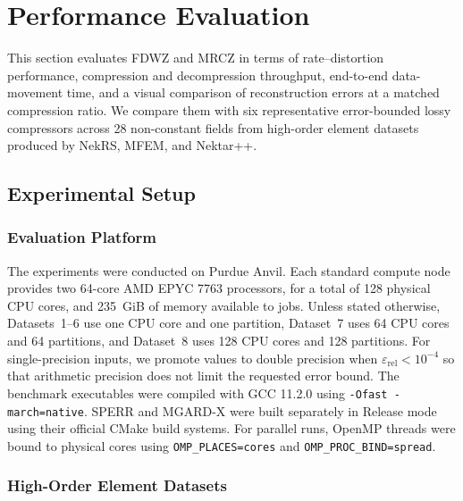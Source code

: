 \section{Performance Evaluation}\label{sec:performance evaluation}

This section evaluates FDWZ and MRCZ in terms of rate--distortion performance, compression and decompression throughput, end-to-end data-movement time, and a visual comparison of reconstruction errors at a matched compression ratio. We compare them with six representative error-bounded lossy compressors across 28 non-constant fields from high-order element datasets produced by NekRS, MFEM, and Nektar++.

\subsection{Experimental Setup}\label{sec:performance evaluation:setup}

\subsubsection{Evaluation Platform}\label{sec:evaluation-platform}\mbox{}

The experiments were conducted on Purdue Anvil. Each standard compute node provides two 64-core AMD EPYC 7763 processors, for a total of 128 physical CPU cores, and 235~GiB of memory available to jobs. Unless stated otherwise, Datasets~1--6 use one CPU core and one partition, Dataset~7 uses 64 CPU cores and 64 partitions, and Dataset~8 uses 128 CPU cores and 128 partitions. For single-precision inputs, we promote values to double precision when $\varepsilon_{\mathrm{rel}}<10^{-4}$ so that arithmetic precision does not limit the requested error bound. The benchmark executables were compiled with GCC 11.2.0 using \verb|-Ofast -march=native|. SPERR and MGARD-X were built separately in Release mode using their official CMake build systems. For parallel runs, OpenMP threads were bound to physical cores using \verb|OMP_PLACES=cores| and \verb|OMP_PROC_BIND=spread|.

\subsubsection{High-Order Element Datasets}\mbox{}

